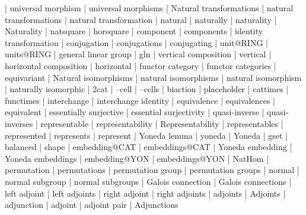     |   universal morphism
    |   universal morphisms
    |   Natural transformations
    |   natural transformations
    |   natural transformation
    |   natural
    |   naturally
    |   naturality
    |   Naturality
    |   natsquare
    |   horsquare
    |   component
    |   components
    |   identity transformation
    |   conjugation
    |   conjugations
    |   conjugating
    |   unit@RING
    |   units@RING
    |   general linear group
    |   gln
    |   vertical composition
    |   vertical
    |   horizontal composition
    |   horizontal
    |   functor category
    |   functor categories
    |   equivariant
    |   Natural isomorphisms
    |   natural isomorphisms
    |   natural isomorphism
    |   naturally isomorphic
    |   2cat
    |   --cell
    |   --cells
    |   biaction
    |   placeholder
    |   cattimes
    |   functimes
    |   interchange
    |   interchange identity
    |   equivalence
    |   equivalences
    |   equivalent
    |   essentially surjective
    |   essential surjectivity
    |   quasi-inverse
    |   quasi-inverses
    |   representable
    |   representability
    |   Representability
    |   representables
    |   represented
    |   represents
    |   represent
    |   Yoneda lemma
    |   yoneda
    |   Yoneda
    |   gset
    |   balanced
    |   shape
    |   embedding@CAT
    |   embeddings@CAT
    |   Yoneda embedding
    |   Yoneda embeddings
    |   embedding@YON
    |   embeddings@YON
    |   NatHom
    |   permutation
    |   permutations
    |   permutation group
    |   permutation groups
    |   normal
    |   normal subgroup
    |   normal subgroups
    |   Galois connection
    |   Galois connections
    |   left adjoint
    |   left adjoints
    |   right adjoint
    |   right adjoints
    |   adjoints
    |   Adjoints
    |   adjunction
    |   adjoint
    |   adjoint pair
    |   Adjunctions
